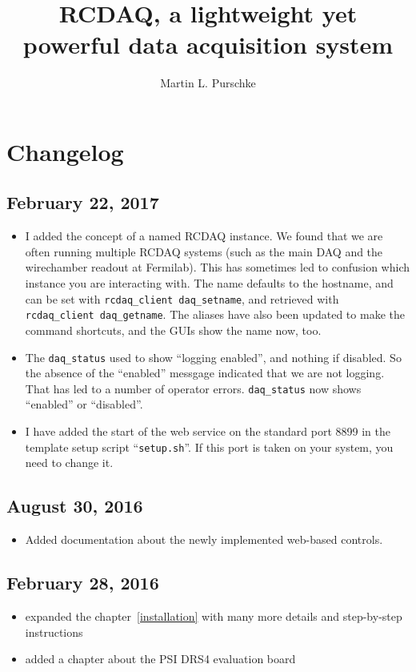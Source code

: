 \documentclass{article}[11pt]
\begin{document}
\title{RCDAQ, a lightweight yet powerful data acquisition system}
\author{Martin L. Purschke}
\maketitle

\tableofcontents

\newpage

\section{Changelog}

\subsection{February 22, 2017}
\begin{itemize}
\item I added the concept of a named RCDAQ instance. We found that we
  are often running multiple RCDAQ systems (such as the main DAQ and
  the wirechamber readout at Fermilab). This has sometimes led to
  confusion which instance you are interacting with. The name
  defaults to the hostname, and can be set with
  \verb|rcdaq_client daq_setname|, and retrieved with
  \verb|rcdaq_client daq_getname|.  The aliases have also been
  updated to make the command shortcuts, and the GUIs show the name
  now, too. 
\item The \verb|daq_status| used to show ``logging enabled'', and nothing if
  disabled. So the absence of the ``enabled'' messgage indicated
  that we are not logging. That has led to a number of operator
  errors. \verb|daq_status| now shows ``enabled'' or ``disabled''. 
\item I have added the start of the web service on the standard port
  8899 in the template setup script ``\verb|setup.sh|''. If this port
  is taken on your system, you need to change it. 

\end{itemize}

\subsection{August 30, 2016}
\begin{itemize}
\item Added documentation about the newly implemented web-based controls. 
\end{itemize}

\subsection{February 28, 2016}
\begin{itemize}
\item expanded the chapter~\ref{installation} with many more details
  and step-by-step instructions
\item  added a chapter about the PSI DRS4 evaluation board 
\end{itemize}
\end{document}

